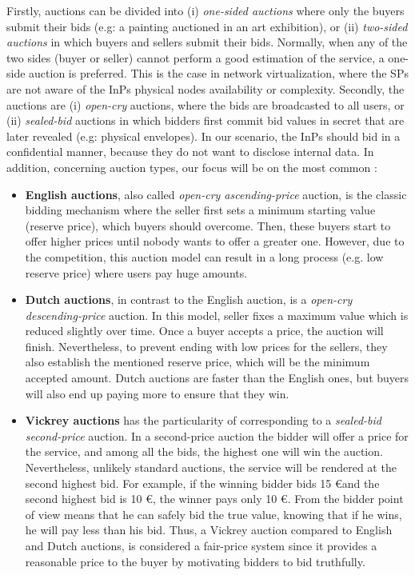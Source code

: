 Firstly, auctions can be divided into (i) \textit{one-sided auctions} where only the buyers submit their bids (e.g: a painting auctioned in an art exhibition), or (ii) \textit{two-sided auctions} in which buyers and sellers submit their bids. Normally, when any of the two sides (buyer or seller) cannot perform a good estimation of the service, a one-side auction is preferred. This is the case in network virtualization, where the SPs are not aware of the InPs physical nodes availability or complexity. Secondly, the auctions are (i) \textit{open-cry} auctions, where the bids are broadcasted to all users, or (ii) \textit{sealed-bid} auctions in which bidders first commit bid values in secret that are later revealed (e.g: physical envelopes). In our scenario, the InPs should bid in a confidential manner, because they do not want to disclose internal data. In addition, concerning auction types, our focus will be on the most common \cite{coppinger1980incentives}: 

\begin{itemize}
	\item \textbf{English auctions}, also called \textit{open-cry ascending-price} auction, is the classic bidding mechanism where the seller first sets a minimum starting value (reserve price), which buyers should overcome. Then, these buyers start to offer higher prices until nobody wants to offer a greater one. However, due to the competition, this auction model can result in a long process (e.g. low reserve price) where users pay huge amounts.
	\item \textbf{Dutch auctions}, in contrast to the English auction, is a \textit{open-cry descending-price} auction. In this model, seller fixes a maximum value which is reduced slightly over time. Once a buyer accepts a price, the auction will finish. Nevertheless, to prevent ending with low prices for the sellers, they also establish the mentioned reserve price, which will be the minimum accepted amount. Dutch auctions are faster than the English ones, but buyers will also end up paying more to ensure that they win.
	\item \textbf{Vickrey auctions} \cite{vickrey1961counterspeculation} has the particularity of corresponding to a \textit{sealed-bid second-price} auction. In a second-price auction the bidder will offer a price for the service, and among all the bids, the highest one will win the auction. Nevertheless, unlikely standard auctions, the service will be rendered at the second highest bid. For example, if the winning bidder bids 15 \euro and the second highest bid is 10 \euro, the winner pays only 10 \euro. From the bidder point of view means that he can safely bid the true value, knowing that if he wins, he will pay less than his bid. Thus, a Vickrey auction compared to English and Dutch auctions, is considered a fair-price system since it provides a reasonable price to the buyer by motivating bidders to bid truthfully. 		
\end{itemize}

